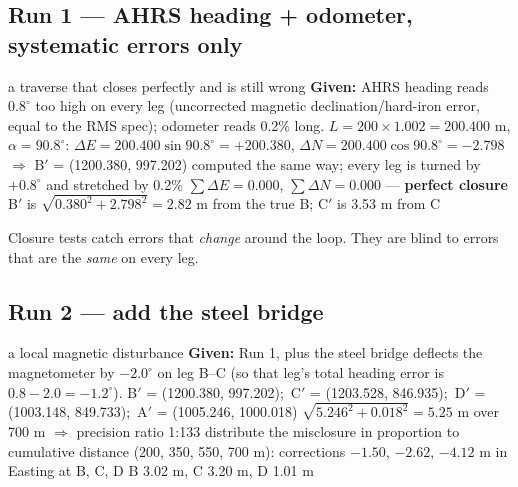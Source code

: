 \subsection*{Run 1 --- AHRS heading + odometer, systematic errors only}

\begin{worked}{a traverse that closes perfectly and is still wrong}
\textbf{Given:} AHRS heading reads $0.8^\circ$ too high on every leg (uncorrected magnetic declination/hard-iron error, equal to the RMS spec); odometer reads 0.2\% long.
 $L=200\times1.002=200.400$ m, $\alpha=90.8^\circ$: $\Delta E=200.400\sin90.8^\circ=+200.380$, $\Delta N=200.400\cos90.8^\circ=-2.798$ $\Rightarrow$ B$'$ = (1200.380, 997.202)
 computed the same way; every leg is turned by $+0.8^\circ$ and stretched by 0.2\%
 $\sum\Delta E=0.000$, $\sum\Delta N=0.000$ --- \textbf{perfect closure}
 B$'$ is $\sqrt{0.380^2+2.798^2}=2.82$ m from the true B; C$'$ is 3.53 m from C
\end{worked}

\begin{bigidea}
Closure tests catch errors that \emph{change} around the loop. They are blind to errors that are the \emph{same} on every leg.
\end{bigidea}

\subsection*{Run 2 --- add the steel bridge}
\begin{worked}{a local magnetic disturbance}
\textbf{Given:} Run 1, plus the steel bridge deflects the magnetometer by $-2.0^\circ$ on leg B--C (so that leg's total heading error is $0.8-2.0=-1.2^\circ$).
 B$'$ = (1200.380, 997.202);\ C$'$ = (1203.528, 846.935);\ D$'$ = (1003.148, 849.733);\ A$'$ = (1005.246, 1000.018)
 $\sqrt{5.246^2+0.018^2}=5.25$ m over 700 m $\Rightarrow$ precision ratio 1:133
 distribute the misclosure in proportion to cumulative distance (200, 350, 550, 700 m): corrections $-1.50$, $-2.62$, $-4.12$ m in Easting at B, C, D
 B 3.02 m, C 3.20 m, D 1.01 m
\end{worked}

